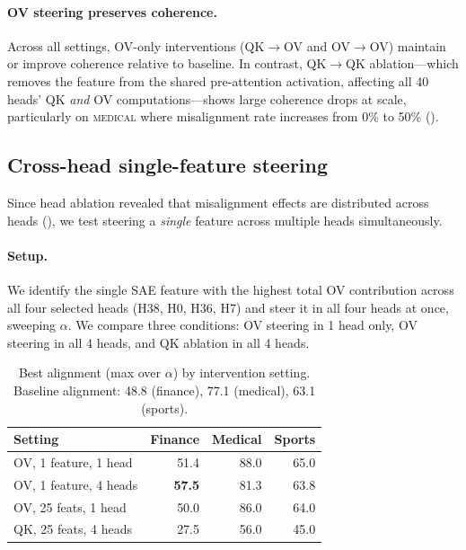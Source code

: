\documentclass{article}
\theoremstyle{plain}
\theoremstyle{definition}
\theoremstyle{remark}
\begin{document}
\paragraph{OV steering preserves coherence.} Across all settings, OV-only interventions (QK$\to$OV and OV$\to$OV) maintain or improve coherence relative to baseline. In contrast, QK$\to$QK ablation---which removes the feature from the shared pre-attention activation, affecting all 40 heads' QK \emph{and} OV computations---shows large coherence drops at scale, particularly on \textsc{medical} where misalignment rate increases from 0\% to 50\% ().

\subsection{Cross-head single-feature steering}
\label{sec:multihead}

Since head ablation revealed that misalignment effects are distributed across heads (), we test steering a \emph{single} feature across multiple heads simultaneously.

\paragraph{Setup.} We identify the single SAE feature with the highest total OV contribution across all four selected heads (H38, H0, H36, H7) and steer it in all four heads at once, sweeping $\alpha$. We compare three conditions: OV steering in 1 head only, OV steering in all 4 heads, and QK ablation in all 4 heads.

\begin{table}[t]
\caption{Best alignment (max over $\alpha$) by intervention setting. Baseline alignment: 48.8 (finance), 77.1 (medical), 63.1 (sports).}
\label{tab:best_alignment}
\centering
\small
\begin{tabular}{lrrr}
\toprule
Setting & Finance & Medical & Sports \\
\midrule
OV, 1 feature, 1 head & 51.4 & 88.0 & 65.0 \\
OV, 1 feature, 4 heads & \textbf{57.5} & 81.3 & 63.8 \\
OV, 25 feats, 1 head & 50.0 & 86.0 & 64.0 \\
QK, 25 feats, 4 heads & 27.5 & 56.0 & 45.0 \\
\bottomrule
\end{tabular}
\end{table}
\end{document}

